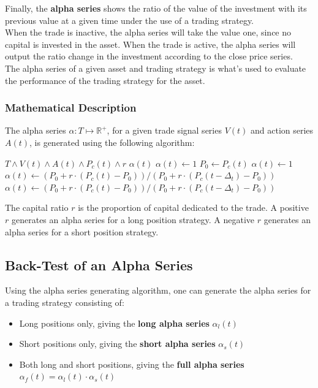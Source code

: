 \documentclass[11pt]{article}
\begin{document}
Finally, the \textbf{alpha series} shows the ratio of the value of the investment with its previous value at a given time under the use of a trading strategy.\\

When the trade is inactive, the alpha series will take the value one, since no capital is invested in the asset. When the trade is active, the alpha series will output the ratio change in the investment according to the close price series.\\

The alpha series of a given asset and trading strategy is what's used to evaluate the performance of the trading strategy for the asset.

\subsubsection{Mathematical Description}

The alpha series $\alpha : T \mapsto \mathbb{R}^{+}$, for a given trade signal series $V(t)$ and action series $A(t)$, is generated using the following algorithm:

\begin{algorithmic}[1]
\REQUIRE $T \wedge V(t) \wedge A(t) \wedge P_c(t) \wedge r$
\ENSURE $\alpha(t)$
\STATE $\alpha(t) \leftarrow 1$
\STATE $P_0 \leftarrow P_c(t)$
\STATE $\alpha(t) \leftarrow 1$
\STATE $\alpha(t) \leftarrow (P_0 + r \cdot (P_c(t) - P_0))/(P_0 + r \cdot (P_c(t- \Delta_t) - P_0))$
\ENDIF
{}
\STATE $\alpha(t) \leftarrow (P_0 + r \cdot (P_c(t) - P_0))/(P_0 + r \cdot (P_c(t- \Delta_t) - P_0))$
\ENDIF
\ENDFOR
\end{algorithmic}
The capital ratio $r$ is the proportion of capital dedicated to the trade. A positive $r$ generates an alpha series for a long position strategy. A negative $r$ generates an alpha series for a short position strategy.

\subsection{Back-Test of an Alpha Series}

Using the alpha series generating algorithm, one can generate the alpha series for a trading strategy consisting of:

\begin{itemize}
    \item Long positions only, giving the \textbf{long alpha series} $\alpha_l(t)$
    \item Short positions only, giving the \textbf{short alpha series} $\alpha_s(t)$
    \item Both long and short positions, giving the \textbf{full alpha series} $\alpha_f(t) = \alpha_l(t) \cdot \alpha_s(t)$
\end{itemize}
\end{document}
